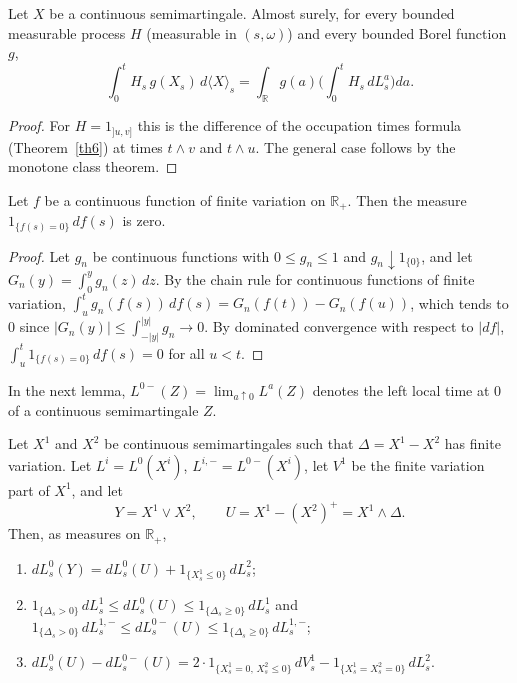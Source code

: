 \begin{lemma}\label{lem:occupation-weighted}
	Let $X$ be a continuous semimartingale. Almost surely, for every bounded
	measurable process $H$ (measurable in $(s,\omega)$) and every bounded Borel
	function $g$,
	\[
		\int_0^t H_s\, g(X_s)\,d\langle X\rangle_s = \int_\mathbb{R} g(a) \Big(\int_0^t H_s\, dL^a_s\Big) da .
	\]
\end{lemma}

\begin{proof}
	For $H = 1_{]u,v]}$ this is the difference of the occupation times formula
	(Theorem~\ref{th6}) at times $t\wedge v$ and $t\wedge u$. The general case
	follows by the monotone class theorem.
\end{proof}

\begin{lemma}\label{lem:fv-level}
	Let $f$ be a continuous function of finite variation on $\mathbb{R}_+$. Then
	the measure $1_{\{f(s) = 0\}}\,df(s)$ is zero.
\end{lemma}

\begin{proof}
	Let $g_n$ be continuous functions with $0\leqslant g_n\leqslant 1$ and
	$g_n \downarrow 1_{\{0\}}$, and let $G_n(y)=\int_0^y g_n(z)\,dz$. By the chain
	rule for continuous functions of finite variation,
	$\int_u^t g_n(f(s))\,df(s) = G_n(f(t)) - G_n(f(u))$, which tends to $0$ since
	$|G_n(y)| \leqslant \int_{-|y|}^{|y|} g_n \to 0$. By dominated convergence with
	respect to $|df|$, $\int_u^t 1_{\{f(s)=0\}}\,df(s) = 0$ for all $u<t$.
\end{proof}

In the next lemma, $L^{0-}(Z) = \lim_{a\uparrow 0}L^a(Z)$ denotes the left local
time at $0$ of a continuous semimartingale $Z$.

\begin{lemma}\label{lem:max}
	Let $X^1$ and $X^2$ be continuous semimartingales such that
	$\Delta = X^1 - X^2$ has finite variation. Let $L^i = L^0(X^i)$,
	$L^{i,-} = L^{0-}(X^i)$, let $V^1$ be the finite variation part of $X^1$, and let
	\[
		Y = X^1\vee X^2, \qquad U = X^1 - (X^2)^+ = X^1 \wedge \Delta .
	\]
	Then, as measures on $\mathbb{R}_+$,
	\begin{enumerate}[label=(\alph*)]
		\item $dL^0_s(Y) = dL^0_s(U) + 1_{\{X^1_s\leqslant 0\}}\,dL^2_s$;
		\item $1_{\{\Delta_s>0\}}\,dL^1_s \leqslant dL^0_s(U) \leqslant 1_{\{\Delta_s\geqslant 0\}}\,dL^1_s$
		      and
		      $1_{\{\Delta_s>0\}}\,dL^{1,-}_s \leqslant dL^{0-}_s(U) \leqslant 1_{\{\Delta_s\geqslant 0\}}\,dL^{1,-}_s$;
		\item $dL^0_s(U) - dL^{0-}_s(U) = 2\cdot 1_{\{X^1_s=0,\, X^2_s\leqslant 0\}}\,dV^1_s
			      - 1_{\{X^1_s=X^2_s=0\}}\,dL^2_s$.
	\end{enumerate}
\end{lemma}

